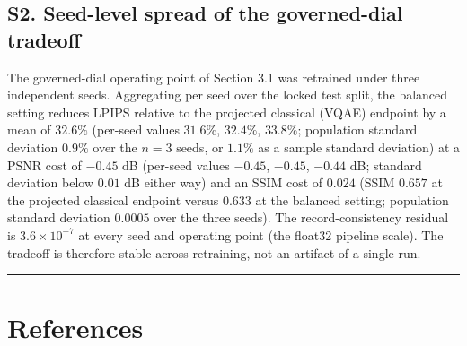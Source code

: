 \documentclass[11pt]{article}
\begin{document}
\subsection*{S2. Seed-level spread of the governed-dial tradeoff}

The governed-dial operating point of Section 3.1 was retrained under three independent seeds. Aggregating per seed over the locked test split, the balanced setting reduces LPIPS relative to the projected classical (VQAE) endpoint by a mean of $32.6\%$ (per-seed values $31.6\%$, $32.4\%$, $33.8\%$; population standard deviation $0.9\%$ over the $n=3$ seeds, or $1.1\%$ as a sample standard deviation) at a PSNR cost of $-0.45$ dB (per-seed values $-0.45$, $-0.45$, $-0.44$ dB; standard deviation below $0.01$ dB either way) and an SSIM cost of $0.024$ (SSIM $0.657$ at the projected classical endpoint versus $0.633$ at the balanced setting; population standard deviation $0.0005$ over the three seeds). The record-consistency residual is $3.6\times10^{-7}$ at every seed and operating point (the float32 pipeline scale). The tradeoff is therefore stable across retraining, not an artifact of a single run.

\medskip\hrule\medskip

\section*{References}
\end{document}
